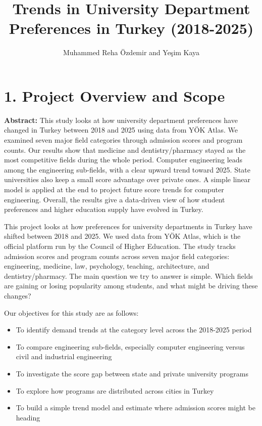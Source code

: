 \documentclass[
  11pt,
  a4paper,
  DIV=11,
  numbers=noendperiod]{scrartcl}
\title{Trends in University Department Preferences in Turkey
(2018-2025)}
\author{Muhammed Reha Özdemir and Yeşim Kaya}
\date{}
\providecommand{\tightlist}{%
  \setlength{\itemsep}{0pt}\setlength{\parskip}{0pt}}
\begin{document}
\maketitle


\section{1. Project Overview and
Scope}\label{project-overview-and-scope}

\textbf{Abstract:} This study looks at how university department
preferences have changed in Turkey between 2018 and 2025 using data from
YÖK Atlas. We examined seven major field categories through admission
scores and program counts. Our results show that medicine and
dentistry/pharmacy stayed as the most competitive fields during the
whole period. Computer engineering leads among the engineering
sub-fields, with a clear upward trend toward 2025. State universities
also keep a small score advantage over private ones. A simple linear
model is applied at the end to project future score trends for computer
engineering. Overall, the results give a data-driven view of how student
preferences and higher education supply have evolved in Turkey.

This project looks at how preferences for university departments in
Turkey have shifted between 2018 and 2025. We used data from YÖK Atlas,
which is the official platform run by the Council of Higher Education.
The study tracks admission scores and program counts across seven major
field categories: engineering, medicine, law, psychology, teaching,
architecture, and dentistry/pharmacy. The main question we try to answer
is simple. Which fields are gaining or losing popularity among students,
and what might be driving these changes?

Our objectives for this study are as follows:

\begin{itemize}
\tightlist
\item
  To identify demand trends at the category level across the 2018-2025
  period
\item
  To compare engineering sub-fields, especially computer engineering
  versus civil and industrial engineering
\item
  To investigate the score gap between state and private university
  programs
\item
  To explore how programs are distributed across cities in Turkey
\item
  To build a simple trend model and estimate where admission scores
  might be heading
\end{itemize}
\end{document}
